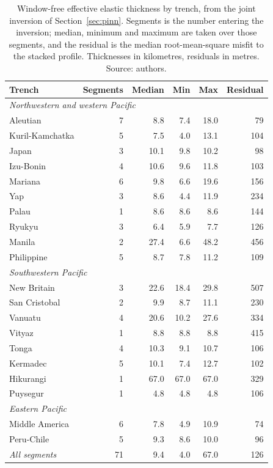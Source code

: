 \documentclass[final]{agujournal2019}
\begin{document}
\begin{table}\centering
  \caption{Window-free effective elastic thickness by trench, from the joint
  inversion of Section~\ref{sec:pinn}. Segments is the number entering the
  inversion; median, minimum and maximum are taken over those segments, and the
  residual is the median root-mean-square misfit to the stacked profile.
  Thicknesses in kilometres, residuals in metres. Source: authors.}
  \label{tab:tebytrench}
  \begin{tabular}{lrrrrr}
    \toprule
    Trench & Segments & Median & Min & Max & Residual \\
    \midrule
    \multicolumn{6}{l}{\textit{Northwestern and western Pacific}} \\
    Aleutian         &  7 &   8.8 &   7.4 &  18.0 &  79 \\
    Kuril-Kamchatka  &  5 &   7.5 &   4.0 &  13.1 & 104 \\
    Japan            &  3 &  10.1 &   9.8 &  10.2 &  98 \\
    Izu-Bonin        &  4 &  10.6 &   9.6 &  11.8 & 103 \\
    Mariana          &  6 &   9.8 &   6.6 &  19.6 & 156 \\
    Yap              &  3 &   8.6 &   4.4 &  11.9 & 234 \\
    Palau            &  1 &   8.6 &   8.6 &   8.6 & 144 \\
    Ryukyu           &  3 &   6.4 &   5.9 &   7.7 & 126 \\
    Manila           &  2 &  27.4 &   6.6 &  48.2 & 456 \\
    Philippine       &  5 &   8.7 &   7.8 &  11.2 & 109 \\
    \midrule
    \multicolumn{6}{l}{\textit{Southwestern Pacific}} \\
    New Britain      &  3 &  22.6 &  18.4 &  29.8 & 507 \\
    San Cristobal    &  2 &   9.9 &   8.7 &  11.1 & 230 \\
    Vanuatu          &  4 &  20.6 &  10.2 &  27.6 & 334 \\
    Vityaz           &  1 &   8.8 &   8.8 &   8.8 & 415 \\
    Tonga            &  4 &  10.3 &   9.1 &  10.7 & 106 \\
    Kermadec         &  5 &  10.1 &   7.4 &  12.7 & 102 \\
    Hikurangi        &  1 &  67.0 &  67.0 &  67.0 & 329 \\
    Puysegur         &  1 &   4.8 &   4.8 &   4.8 & 106 \\
    \midrule
    \multicolumn{6}{l}{\textit{Eastern Pacific}} \\
    Middle America   &  6 &   7.8 &   4.9 &  10.9 &  74 \\
    Peru-Chile       &  5 &   9.3 &   8.6 &  10.0 &  96 \\
    \midrule
    \textit{All segments} & 71 &   9.4 &   4.0 &  67.0 & 126 \\
    \bottomrule
  \end{tabular}
\end{table}
\end{document}
